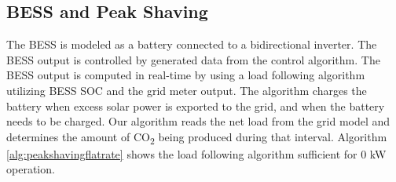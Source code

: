 \documentclass[conference]{IEEEtran}
\begin{document}
    \subsection{BESS and Peak Shaving}
    	The BESS is modeled as a battery connected to a bidirectional inverter. The BESS output is controlled by generated data from the control algorithm. The BESS output is computed in real-time by using a load following algorithm utilizing  BESS SOC and the grid meter output. The algorithm charges the battery when excess solar power is exported to the grid, and when the battery needs to be charged. Our algorithm reads the net load from the grid  model and determines the amount of CO\textsubscript{2} being produced during that interval.  Algorithm \ref{alg:peakshavingflatrate} shows the load following algorithm sufficient for 0 kW operation. 
\end{document}
